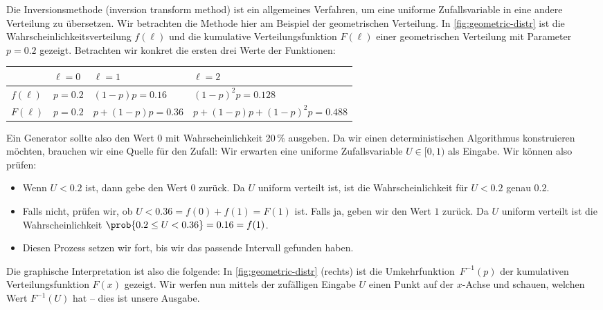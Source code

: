 Die  Inversionsmethode (inversion transform method) ist ein allgemeines Verfahren, um eine uniforme Zufallsvariable in eine andere Verteilung zu übersetzen.
Wir betrachten die Methode hier am Beispiel der geometrischen Verteilung.
In \cref{fig:geometric-distr} ist die Wahrscheinlichkeitsverteilung $f(\ell)$ und die kumulative Verteilungsfunktion $F(\ell)$ einer geometrischen Verteilung mit Parameter $p = 0.2$ gezeigt.
%
Betrachten wir konkret die ersten drei Werte der Funktionen:

\begin{center}
    \begin{tabular}{l|p{}p{}p{}}
                  & $\ell = 0$ & $\ell = 1$              & $\ell = 2$                              \\\hline\hline
        $f(\ell)$ & $p =0.2$   & $(1 {-} p)p = 0.16$     & $(1 {-} p)^2p = 0.128$                  \\
        $F(\ell)$ & $p =0.2$   & $p{+}(1 {-} p)p = 0.36$ & $p{+}(1 {-} p)p{+}(1 {-} p)^2p = 0.488$
    \end{tabular}
\end{center}
\vspace{1em}

Ein Generator sollte also \zB den Wert $0$ mit Wahrscheinlichkeit 20\,\% ausgeben.
Da wir einen deterministischen Algorithmus konstruieren möchten, brauchen wir eine Quelle für den Zufall:
Wir erwarten eine uniforme Zufallsvariable $U \in [0, 1)$ als Eingabe.
Wir können also \zB prüfen:
\begin{itemize}
    \item Wenn $U < 0.2$ ist, dann gebe den Wert $0$ zurück.
          Da $U$ uniform verteilt ist, ist die Wahrscheinlichkeit für $U < 0.2$ genau $0.2$.

    \item Falls nicht, prüfen wir, ob $U < 0.36 = f(0) + f(1) = F(1)$ ist. Falls ja, geben wir den Wert $1$ zurück.
Da $U$ uniform verteilt ist die Wahrscheinlichkeit $\prob{0.2 \le U < 0.36} = 0.16 = f(1)$.

    \item Diesen Prozess setzen wir fort, bis wir das passende Intervall gefunden haben.
\end{itemize}

Die graphische Interpretation ist also die folgende:
In \cref{fig:geometric-distr} (rechts) ist die Umkehrfunktion~$F^{-1}(p)$ der kumulativen Verteilungsfunktion $F(x)$ gezeigt.
Wir werfen nun mittels der zufälligen Eingabe $U$ einen Punkt auf der $x$-Achse und schauen, welchen Wert $F^{-1}(U)$ hat -- dies ist unsere Ausgabe.

